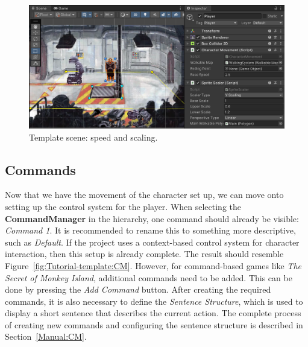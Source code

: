 \begin{figure}[H]
\centering
\includegraphics[width=1\linewidth]{img/User doc/image_2025-07-08_111936005.png}
\caption{Template scene: speed and scaling.}
\label{fig:Tutorial-template:Speed&Scaling}
\end{figure}

\subsection{Commands}
Now that we have the movement of the character set up, we can move onto setting up the control system for the player. When selecting the \textbf{CommandManager} in the hierarchy, one command should already be visible: \textit{Command 1}. It is recommended to rename this to something more descriptive, such as \textit{Default}. If the project uses a context-based control system for character interaction, then this setup is already complete. The result should resemble Figure~\ref{fig:Tutorial-template:CM}. However, for command-based games like \textit{The Secret of Monkey Island}, additional commands need to be added. This can be done by pressing the \textit{Add Command} button. After creating the required commands, it is also necessary to define the \textit{Sentence Structure}, which is used to display a short sentence that describes the current action. The complete process of creating new commands and configuring the sentence structure is described in Section~\ref{Manual:CM}.

